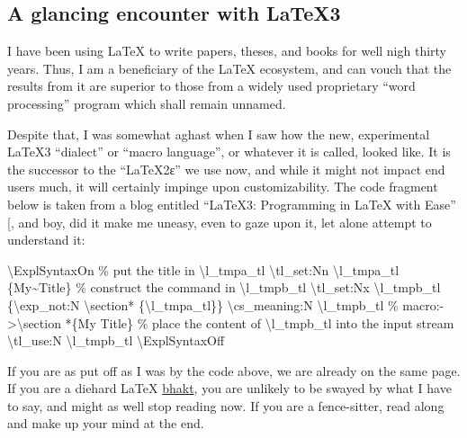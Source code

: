 \documentclass[
  a4paper,
]{article}
\newenvironment{Shaded}{\begin{snugshade}}{\end{snugshade}}
\newcommand{\CommentTok}[1]{\textcolor[rgb]{0.50,0.62,0.50}{#1}}
\newcommand{\FunctionTok}[1]{\textcolor[rgb]{0.94,0.94,0.56}{#1}}
\newcommand{\KeywordTok}[1]{\textcolor[rgb]{0.94,0.87,0.69}{#1}}
\newcommand{\NormalTok}[1]{\textcolor[rgb]{0.80,0.80,0.80}{#1}}
\begin{document}
\subsection{A glancing encounter with
LaTeX3}\label{a-glancing-encounter-with-latex3}

I have been using LaTeX to write papers, theses, and books for well nigh
thirty years. Thus, I am a beneficiary of the LaTeX ecosystem, and can
vouch that the results from it are superior to those from a widely used
proprietary ``word processing'' program which shall remain unnamed.

Despite that, I was somewhat aghast when I saw how the new, experimental
LaTeX3 ``dialect'' or ``macro language'', or whatever it is called,
looked like. It is the successor to the ``LaTeX2ɛ'' we use now, and
while it might not impact end users much, it will certainly impinge upon
customizability. The code fragment below is taken from a blog entitled
``LaTeX3: Programming in LaTeX with Ease''
{[}\citeproc{ref-xiang2020}{3}{]}, and boy, did it make me uneasy, even
to gaze upon it, let alone attempt to understand it:

\begin{Shaded}
\begin{Highlighting}[]
\FunctionTok{\textbackslash{}ExplSyntaxOn}
\CommentTok{\% put the title in \textbackslash{}l\_tmpa\_tl}
\FunctionTok{\textbackslash{}tl}\NormalTok{\_set:Nn }\FunctionTok{\textbackslash{}l}\NormalTok{\_tmpa\_tl \{My\textasciitilde{}Title\}}
\CommentTok{\% construct the command in \textbackslash{}l\_tmpb\_tl}
\FunctionTok{\textbackslash{}tl}\NormalTok{\_set:Nx }\FunctionTok{\textbackslash{}l}\NormalTok{\_tmpb\_tl \{}\FunctionTok{\textbackslash{}exp}\NormalTok{\_not:N }\KeywordTok{\textbackslash{}section*}\NormalTok{ \{}\FunctionTok{\textbackslash{}l}\NormalTok{\_tmpa\_tl\}\}}
\FunctionTok{\textbackslash{}cs}\NormalTok{\_meaning:N }\FunctionTok{\textbackslash{}l}\NormalTok{\_tmpb\_tl }\CommentTok{\% macro:{-}\textgreater{}\textbackslash{}section *\{My Title\}}
\CommentTok{\% place the content of \textbackslash{}l\_tmpb\_tl into the input stream}
\FunctionTok{\textbackslash{}tl}\NormalTok{\_use:N }\FunctionTok{\textbackslash{}l}\NormalTok{\_tmpb\_tl}
\FunctionTok{\textbackslash{}ExplSyntaxOff}
\end{Highlighting}
\end{Shaded}

If you are as put off as I was by the code above, we are already on the
same page. If you are a diehard LaTeX
\href{https://www.collinsdictionary.com/dictionary/hindi-english/\%E0\%A4\%AD\%E0\%A4\%95\%E0\%A5\%8D\%E0\%A4\%A4}{bhakt},
you are unlikely to be swayed by what I have to say, and might as well
stop reading now. If you are a fence-sitter, read along and make up your
mind at the end.
\end{document}
